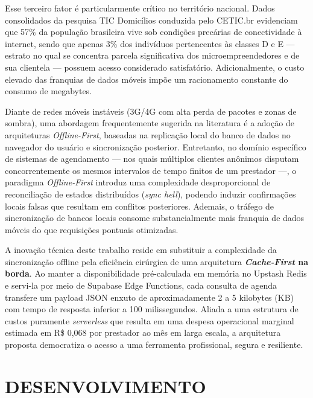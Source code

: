 \documentclass[12pt,a4paper]{article}
\begin{document}
Esse terceiro fator é particularmente crítico no território nacional. Dados consolidados da pesquisa TIC Domicílios conduzida pelo CETIC.br \cite{cetic_tic_domicilios_2024} evidenciam que 57\% da população brasileira vive sob condições precárias de conectividade à internet, sendo que apenas 3\% dos indivíduos pertencentes às classes D e E --- estrato no qual se concentra parcela significativa dos microempreendedores e de sua clientela --- possuem acesso considerado satisfatório. Adicionalmente, o custo elevado das franquias de dados móveis impõe um racionamento constante do consumo de megabytes.

Diante de redes móveis instáveis (3G/4G com alta perda de pacotes e zonas de sombra), uma abordagem frequentemente sugerida na literatura é a adoção de arquiteturas \textit{Offline-First}, baseadas na replicação local do banco de dados no navegador do usuário e sincronização posterior. Entretanto, no domínio específico de sistemas de agendamento --- nos quais múltiplos clientes anônimos disputam concorrentemente os mesmos intervalos de tempo finitos de um prestador ---, o paradigma \textit{Offline-First} introduz uma complexidade desproporcional de reconciliação de estados distribuídos (\textit{sync hell}), podendo induzir confirmações locais falsas que resultam em conflitos posteriores. Ademais, o tráfego de sincronização de bancos locais consome substancialmente mais franquia de dados móveis do que requisições pontuais otimizadas.

A inovação técnica deste trabalho reside em substituir a complexidade da sincronização offline pela eficiência cirúrgica de uma arquitetura \textbf{\textit{Cache-First} na borda}. Ao manter a disponibilidade pré-calculada em memória no Upstash Redis e servi-la por meio de Supabase Edge Functions, cada consulta de agenda transfere um payload JSON enxuto de aproximadamente 2 a 5 kilobytes (KB) com tempo de resposta inferior a 100 milissegundos. Aliada a uma estrutura de custos puramente \textit{serverless} que resulta em uma despesa operacional marginal estimada em R\$ 0,068 por prestador ao mês em larga escala, a arquitetura proposta democratiza o acesso a uma ferramenta profissional, segura e resiliente.


\section{DESENVOLVIMENTO}
\label{sec:desenvolvimento}
\justifying
\end{document}

